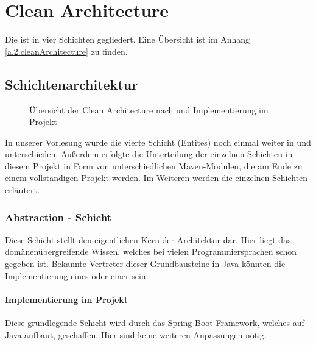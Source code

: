 
\chapter{Clean Architecture} \label{2.cleanArchitecture}
Die  ist in vier Schichten gegliedert. Eine Übersicht ist im Anhang \cref{a.2.cleanArchitecture} zu finden.

	\section{Schichtenarchitektur}
	\begin{figure}[h]
		\centering
		\caption{Übersicht der Clean Architecture nach \cite{cleanArchitecture.dostmann} und Implementierung im Projekt}
		\label{2.cleanArchitecture}
	\end{figure}
	In unserer Vorlesung wurde die vierte Schicht (Entites) noch einmal weiter in  und  unterschieden. Außerdem erfolgte die Unterteilung der einzelnen Schichten in diesem Projekt in Form von unterschiedlichen Maven-Modulen, die am Ende zu einem vollständigen Projekt  werden. Im Weiteren werden die einzelnen Schichten erläutert.

	\newpage

		\subsection{Abstraction - Schicht}
		Diese Schicht stellt den eigentlichen Kern der Architektur dar. Hier liegt das domänenübergreifende Wissen, welches bei vielen Programmiersprachen schon gegeben ist. Bekannte Vertreter dieser Grundbausteine in Java könnten die Implementierung eines  oder einer  sein.
			\subsubsection{Implementierung im Projekt}
			Diese grundlegende Schicht wird durch das Spring Boot Framework, welches auf Java aufbaut, geschaffen. Hier sind keine weiteren Anpassungen nötig.
		
